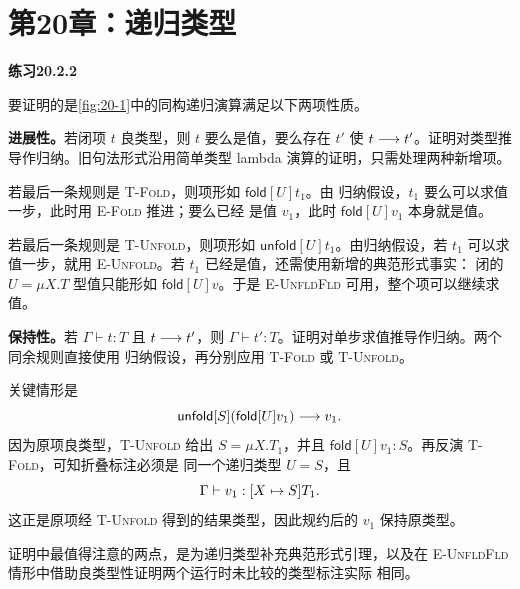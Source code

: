 \section*{第20章：递归类型}

\begin{taplsolutionentrybox}
\label{sol:translator:20.2.2}
\textbf{练习20.2.2}

要证明的是\cref{fig:20-1}中的同构递归演算满足以下两项性质。

\textbf{进展性。}若闭项 \(t\) 良类型，则 \(t\) 要么是值，要么存在
\(t'\) 使 \(t\mathrel{\longrightarrow} t'\)。证明对类型推导作归纳。旧句法形式沿用简单类型
lambda 演算的证明，只需处理两种新增项。

若最后一条规则是 \textsc{T-Fold}，则项形如 \(\mathsf{fold}[U]t_1\)。由
归纳假设，\(t_1\) 要么可以求值一步，此时用 \textsc{E-Fold} 推进；要么已经
是值 \(v_1\)，此时 \(\mathsf{fold}[U]v_1\) 本身就是值。

若最后一条规则是 \textsc{T-Unfold}，则项形如
\(\mathsf{unfold}[U]t_1\)。由归纳假设，若 \(t_1\) 可以求值一步，就用
\textsc{E-Unfold}。若 \(t_1\) 已经是值，还需使用新增的典范形式事实：
闭的 \(U=\mu X.T\) 型值只能形如 \(\mathsf{fold}[U]v\)。于是
\textsc{E-UnfldFld} 可用，整个项可以继续求值。

\textbf{保持性。}若 \(\Gamma\vdash t:T\) 且 \(t\mathrel{\longrightarrow} t'\)，则
\(\Gamma\vdash t':T\)。证明对单步求值推导作归纳。两个同余规则直接使用
归纳假设，再分别应用 \textsc{T-Fold} 或 \textsc{T-Unfold}。

关键情形是
\[
\mathsf{unfold}[S](\mathsf{fold}[U]v_1)\mathrel{\longrightarrow} v_1.
\]
因为原项良类型，\textsc{T-Unfold} 给出 \(S=\mu X.T_1\)，并且
\(\mathsf{fold}[U]v_1:S\)。再反演 \textsc{T-Fold}，可知折叠标注必须是
同一个递归类型 \(U=S\)，且
\[
\Gamma\vdash v_1:[X\mapsto S]T_1.
\]
这正是原项经 \textsc{T-Unfold} 得到的结果类型，因此规约后的 \(v_1\)
保持原类型。

证明中最值得注意的两点，是为递归类型补充典范形式引理，以及在
\textsc{E-UnfldFld} 情形中借助良类型性证明两个运行时未比较的类型标注实际
相同。

\end{taplsolutionentrybox}
